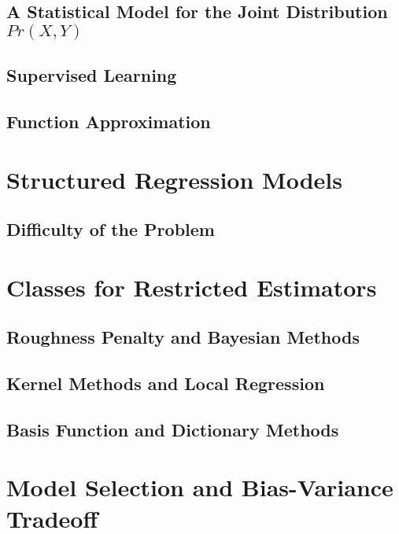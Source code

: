 \documentclass[12pt]{article}
\begin{document}
\subsection{A Statistical Model for the Joint Distribution $Pr(X, Y)$}

\subsection{Supervised Learning}

\subsection{Function Approximation}

\section{Structured Regression Models}

\subsection{Difficulty of the Problem}

\section{Classes for Restricted Estimators}

\subsection{Roughness Penalty and Bayesian Methods}

\subsection{Kernel Methods and Local Regression}

\subsection{Basis Function and Dictionary Methods}

\section{Model Selection and Bias-Variance Tradeoff}
\end{document}
